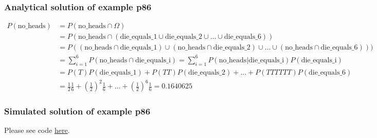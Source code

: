 \begin{frame}
    \frametitle{Analytical solution of example p86}
    \tiny
    \begin{align*}
        P(\text{no\_heads})&=P(\text{no\_heads}\cap\Omega)\\
                           &=P(\text{no\_heads}\cap\left(\text{die\_equals\_1}\cup\text{die\_equals\_2}\cup\dots\cup\text{die\_equals\_6}\right))\\
                           &=P((\text{no\_heads}\cap\text{die\_equals\_1})\cup (\text{no\_heads}\cap\text{die\_equals\_2})\cup\ldots\cup (\text{no\_heads}\cap\text{die\_equals\_6})))\\
                           &=\sum_{i=1}^6P(\text{no\_heads}\cap\text{die\_equals\_i})=\sum_{i=1}^6P(\text{no\_heads}|\text{die\_equals\_i})P(\text{die\_equals\_i})\\
                           &=P(T)P(\text{die\_equals\_1})+
                           P(TT)P(\text{die\_equals\_2})+\ldots +
                           P(TTTTTT)P(\text{die\_equals\_6})\\
                           &=\frac{1}{2}\frac{1}{6}+\left(\frac{1}{2}\right)^2\frac{1}{6}+\ldots+\left(\frac{1}{2}\right)^6\frac{1}{6}=0.1640625
    \end{align*}
    \normalsize

\end{frame}

\begin{frame}[fragile]
    \frametitle{Simulated solution of example p86}

    Please see code
    \href{https://joacorapela.github.io/gcnuBridging2023/auto_examples/foundations/plot_examplep86.html#sphx-glr-auto-examples-foundations-plot-examplep86-py}{here}.

\end{frame}

